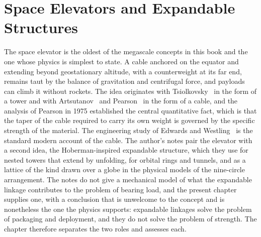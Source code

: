 \chapter{Space Elevators and Expandable Structures}
\label{ch:24}

The space elevator is the oldest of the megascale concepts in this book and the one whose physics is simplest to state. A cable anchored on the equator and extending beyond geostationary altitude, with a counterweight at its far end, remains taut by the balance of gravitation and centrifugal force, and payloads can climb it without rockets. The idea originates with Tsiolkovsky~\cite{tsiolkovsky1895} in the form of a tower and with Artsutanov~\cite{artsutanov1960} and Pearson~\cite{pearson1975} in the form of a cable, and the analysis of Pearson in 1975 established the central quantitative fact, which is that the taper of the cable required to carry its own weight is governed by the specific strength of the material. The engineering study of Edwards and Westling~\cite{edwards2003} is the standard modern account of the cable. The author's notes pair the elevator with a second idea, the Hoberman-inspired expandable structure, which they use for nested towers that extend by unfolding, for orbital rings and tunnels, and as a lattice of the kind drawn over a globe in the physical models of the nine-circle arrangement. The notes do not give a mechanical model of what the expandable linkage contributes to the problem of bearing load, and the present chapter supplies one, with a conclusion that is unwelcome to the concept and is nonetheless the one the physics supports: expandable linkages solve the problem of packaging and deployment, and they do not solve the problem of strength. The chapter therefore separates the two roles and assesses each.


